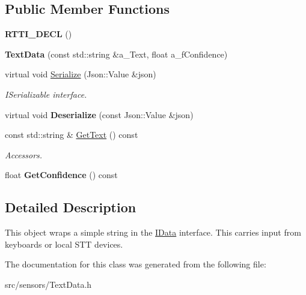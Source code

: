 \subsection*{Public Member Functions}
\begin{DoxyCompactItemize}
\item 
\mbox{\label{class_text_data_a1c368d97ec47d396200c0b578a1cd2c8}} 
{\bfseries R\+T\+T\+I\+\_\+\+D\+E\+CL} ()
\item 
\mbox{\label{class_text_data_aeb1f6464e079759b35b555a8ddecf130}} 
{\bfseries Text\+Data} (const std\+::string \&a\+\_\+\+Text, float a\+\_\+f\+Confidence)
\item 
\mbox{\label{class_text_data_ac6885a98c86ef26dd701a49493eaa4de}} 
virtual void \hyperlink{class_text_data_ac6885a98c86ef26dd701a49493eaa4de}{Serialize} (Json\+::\+Value \&json)
\begin{DoxyCompactList}\small\item\em I\+Serializable interface. \end{DoxyCompactList}\item 
\mbox{\label{class_text_data_ab6c2dc6fc239e3bb783b1d636009cadb}} 
virtual void {\bfseries Deserialize} (const Json\+::\+Value \&json)
\item 
\mbox{\label{class_text_data_ace32a704a5a1d2b632c0ed9175e333d8}} 
const std\+::string \& \hyperlink{class_text_data_ace32a704a5a1d2b632c0ed9175e333d8}{Get\+Text} () const
\begin{DoxyCompactList}\small\item\em Accessors. \end{DoxyCompactList}\item 
\mbox{\label{class_text_data_afb233b8305eb8a1d4941be125c52ee2f}} 
float {\bfseries Get\+Confidence} () const
\end{DoxyCompactItemize}


\subsection{Detailed Description}
This object wraps a simple string in the \hyperlink{class_i_data}{I\+Data} interface. This carries input from keyboards or local S\+TT devices. 

The documentation for this class was generated from the following file\+:\begin{DoxyCompactItemize}
\item 
src/sensors/Text\+Data.\+h\end{DoxyCompactItemize}
